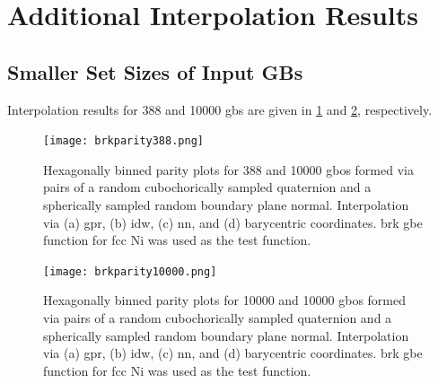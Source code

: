 \documentclass[preprint,12pt]{elsarticle}
\begin{document}
\section{Additional Interpolation Results}

\subsection{Smaller Set Sizes of Input GBs}
Interpolation results for \num{388} and \num{10000} \glspl{gb} are given in \cref{fig:brkparity388} and \cref{fig:brkparity10000}, respectively.

\begin{figure}[!ht]
    \centering
    \texttt{[image: brkparity388.png]}
    \caption{Hexagonally binned parity plots for \num{388} \inpt{} and \num{10000} \outpt{} \glspl{gbo} formed via pairs of a random cubochorically sampled quaternion and a spherically sampled random boundary plane normal. Interpolation via (a) \gls{gpr}, (b) \gls{idw}, (c) \gls{nn}, and (d) barycentric coordinates.  \gls{brk} \gls{gbe} function for \gls{fcc} Ni \cite{bulatovGrainBoundaryEnergy2014} was used as the test function.}
    \label{fig:brkparity388}
\end{figure}

\begin{figure}[!ht]
    \centering
    \texttt{[image: brkparity10000.png]}
    \caption{Hexagonally binned parity plots for \num{10000} \inpt{} and \num{10000} \outpt{} \glspl{gbo} formed via pairs of a random cubochorically sampled quaternion and a spherically sampled random boundary plane normal. Interpolation via (a) \gls{gpr}, (b) \gls{idw}, (c) \gls{nn}, and (d) barycentric coordinates.  \gls{brk} \gls{gbe} function for \gls{fcc} Ni \cite{bulatovGrainBoundaryEnergy2014} was used as the test function.}
    \label{fig:brkparity10000}
\end{figure}
\end{document}
